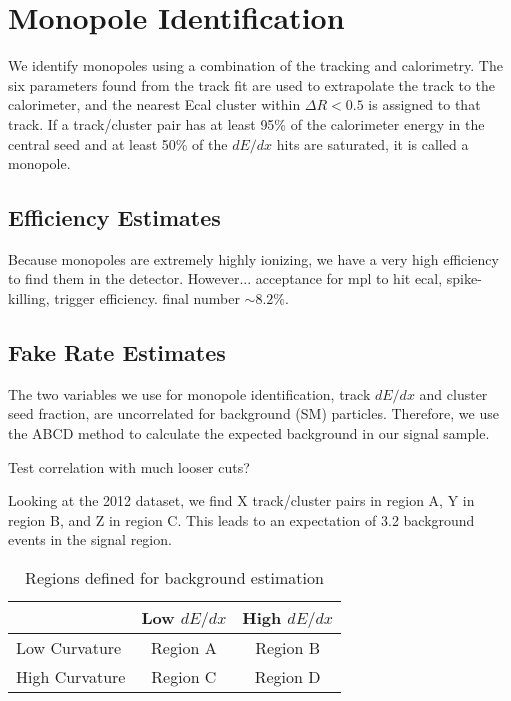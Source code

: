 \section{Monopole Identification}

We identify monopoles using a combination of the tracking and calorimetry.  The six parameters found from the track fit are used to extrapolate the track to the calorimeter, and the nearest Ecal cluster within {\color{red} $\Delta R<0.5$} is assigned to that track.  If a track/cluster pair has at least {\color{red} 95\%} of the calorimeter energy in the central seed and at least {\color{red} 50\%} of the $dE/dx$ hits are saturated, it is called a monopole.

\subsection{Efficiency Estimates}

Because monopoles are extremely highly ionizing, we have a very high efficiency to find them in the detector.  However... {\color{red} acceptance for mpl to hit ecal, spike-killing, trigger efficiency.  final number $\sim 8.2\%$.}

\subsection{Fake Rate Estimates}

The two variables we use for monopole identification, track $dE/dx$ and cluster seed fraction, are uncorrelated for background (SM) particles.  Therefore, we use the ABCD method to calculate the expected background in our signal sample.

{\color{red} Test correlation with much looser cuts?}

Looking at the 2012 dataset, we find {\color{red} X} track/cluster pairs in region A, {\color{red} Y} in region B, and {\color{red} Z} in region C.  This leads to an expectation of {\color{red} 3.2} background events in the signal region.  

\begin{table}
\centering
\begin{tabular}{l|c|c|}
 & Low $dE/dx$ & High $dE/dx$ \\
\hline
Low Curvature & Region A & Region B \\
\hline
High Curvature & Region C & Region D \\
\hline
\end{tabular}
\caption{Regions defined for background estimation}
\label{tab:MplTrackBackgroundABCD}
\end{table}

